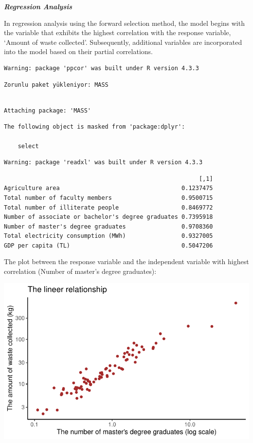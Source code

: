 \documentclass[
  11pt,
  a4paper,
  DIV=11,
  numbers=noendperiod]{scrartcl}
\begin{document}
\textbf{\emph{Regression Analysis}}

In regression analysis using the forward selection method, the model
begins with the variable that exhibits the highest correlation with the
response variable, `Amount of waste collected'. Subsequently, additional
variables are incorporated into the model based on their partial
correlations.

\begin{verbatim}
Warning: package 'ppcor' was built under R version 4.3.3
\end{verbatim}

\begin{verbatim}
Zorunlu paket yükleniyor: MASS
\end{verbatim}

\begin{verbatim}

Attaching package: 'MASS'
\end{verbatim}

\begin{verbatim}
The following object is masked from 'package:dplyr':

    select
\end{verbatim}

\begin{verbatim}
Warning: package 'readxl' was built under R version 4.3.3
\end{verbatim}

\begin{verbatim}
                                                        [,1]
Agriculture area                                   0.1237475
Total number of faculty members                    0.9500715
Total number of illiterate people                  0.8469772
Number of associate or bachelor's degree graduates 0.7395918
Number of master's degree graduates                0.9708360
Total electricity consumption (MWh)                0.9327005
GDP per capita (TL)                                0.5047206
\end{verbatim}

The plot between the response variable and the independent variable with
{highest correlation (Number of master's degree graduates)}:

\includegraphics{project_files/figure-pdf/unnamed-chunk-35-1.pdf}
\end{document}
